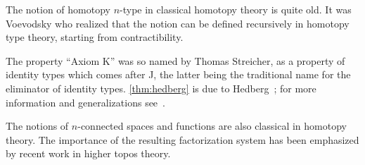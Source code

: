 \begin{comment}
\begin{cor}\label{cor:trunc_prod}
  For any types $A$ and $B$, the induced map $\reflect(A\times B) \to \reflect(A) \times \reflect(B)$ is an equivalence.
\end{cor}
\begin{proof}
  It suffices to show that $\reflect(A) \times \reflect(B)$ has the same universal property as $\reflect(A\times B)$.
  Thus, let $C:\P$; we have
  \begin{align*}
    (\reflect(A) \times \reflect(B) \to C)
    &= (\reflect(A) \to (\reflect(B) \to C))\\
    &= (\reflect(A) \to (B \to C))\\
    &= (A \to (B \to C))\\
    &= (A \times B \to C)
  \end{align*}
  using the universal properties  of $\reflect(B)$ and $\reflect(A)$, along with the fact that $B\to C$ is in \P since $C$ is.
  It is straightforward to verify that this equivalence is given by composing with $\mreturn_A \times \mreturn_B$, as needed.
\end{proof}

It may seem odd that every reflective subcategory of types is automatically an exponential ideal, with a product-preserving reflector.
However, this is also the case classically in the category of \emph{sets}, for the same reasons.
It's just that this fact is not usually remarked on, since the classical category of sets---in contrast to the category of homotopy
types---does not have many interesting reflective subcategories.


\end{comment}



\sectionNotes

The notion of homotopy $n$-type in classical homotopy theory is quite old.
It was Voevodsky who realized that the notion can be defined recursively in homotopy type theory, starting from contractibility.

The property ``Axiom K'' was so named by Thomas Streicher, as a property of identity types which comes after J, the latter being the traditional name for the eliminator of identity types.
\autoref{thm:hedberg} is due to Hedberg~\cite{hedberg1998coherence}; for more information and generalizations see~\cite{krausgeneralizations}.

The notions of $n$-connected spaces and functions are also classical in homotopy theory.
The importance of the resulting factorization system has been emphasized by recent work in higher topos theory.

